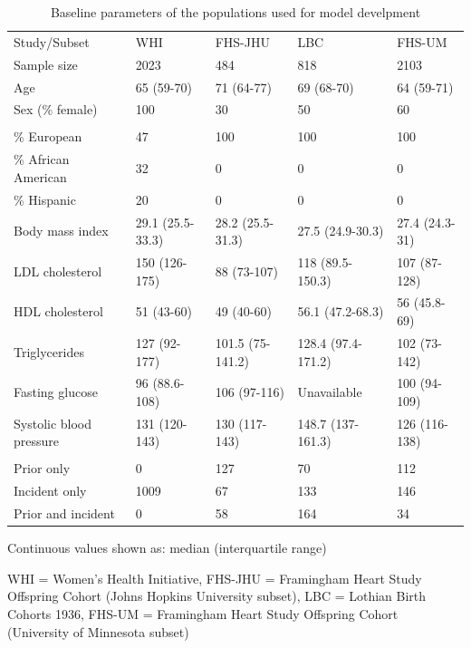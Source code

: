 \documentclass[]{article}
\begin{document}
\begin{table}[t]

\caption{\label{tab:pop-description}Baseline parameters of the populations used for model develpment}
\centering
\begin{threeparttable}
\begin{tabular}{lllll}
\toprule
Study/Subset & WHI & FHS-JHU & LBC & FHS-UM\\
Sample size & 2023 & 484 & 818 & 2103\\
Age & 65 (59-70) & 71 (64-77) & 69 (68-70) & 64 (59-71)\\
Sex (\% female) & 100 & 30 & 50 & 60\\
\addlinespace[0em]
\multicolumn{5}{l}{Ancestry}\\
\hspace{1em}\% European & 47 & 100 & 100 & 100\\
\hspace{1em}\% African American & 32 & 0 & 0 & 0\\
\hspace{1em}\% Hispanic & 20 & 0 & 0 & 0\\
Body mass index & 29.1 (25.5-33.3) & 28.2 (25.5-31.3) & 27.5 (24.9-30.3) & 27.4 (24.3-31)\\
LDL cholesterol & 150 (126-175) & 88 (73-107) & 118 (89.5-150.3) & 107 (87-128)\\
HDL cholesterol & 51 (43-60) & 49 (40-60) & 56.1 (47.2-68.3) & 56 (45.8-69)\\
Triglycerides & 127 (92-177) & 101.5 (75-141.2) & 128.4 (97.4-171.2) & 102 (73-142)\\
Fasting glucose & 96 (88.6-108) & 106 (97-116) & Unavailable & 100 (94-109)\\
Systolic blood pressure & 131 (120-143) & 130 (117-143) & 148.7 (137-161.3) & 126 (116-138)\\
\addlinespace[0em]
\multicolumn{5}{l}{\# CVD events}\\
\hspace{1em}Prior only & 0 & 127 & 70 & 112\\
\hspace{1em}Incident only & 1009 & 67 & 133 & 146\\
\hspace{1em}Prior and incident & 0 & 58 & 164 & 34\\
\bottomrule
\end{tabular}
\begin{tablenotes}
\item * Continuous values shown as: median (interquartile range)
\item * WHI = Women's Health Initiative, FHS-JHU = Framingham Heart Study Offspring Cohort (Johns Hopkins University subset), LBC = Lothian Birth Cohorts 1936, FHS-UM = Framingham Heart Study Offspring Cohort (University of Minnesota subset)
\end{tablenotes}
\end{threeparttable}
\end{table}
\end{document}
